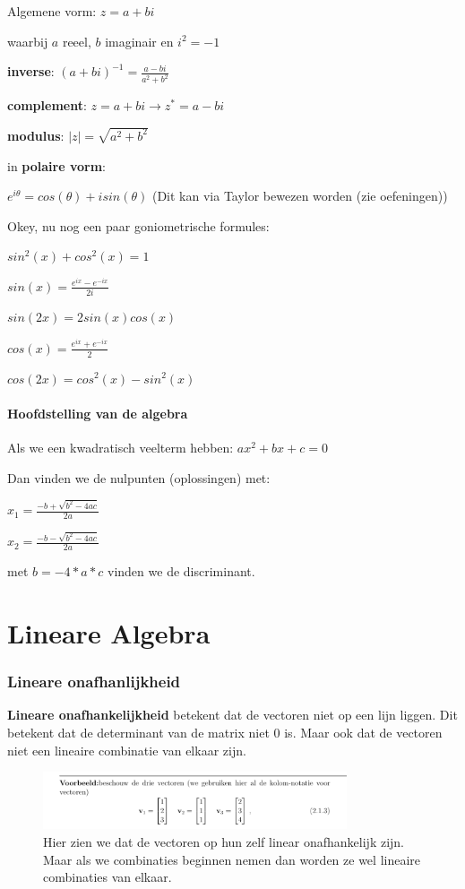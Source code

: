 \documentclass[a4paper]{report}
\begin{document}
Algemene vorm: $z = a + bi$

waarbij $a$ reeel, $b$ imaginair en $i^2 = -1$

\textbf{inverse}: $(a + bi)^{-1} = \frac{a - bi}{a^2 + b^2}$

\textbf{complement}: $z = a + bi \rightarrow z^* = a - bi$

\textbf{modulus}: $|z| = \sqrt{a^2 + b^2}$

in \textbf{polaire vorm}:

$e^{i\theta} = cos(\theta) + i sin(\theta)$ (Dit kan via Taylor bewezen worden (zie oefeningen))

Okey, nu nog een paar goniometrische formules:

$sin^2(x) + cos^2(x) = 1$

$sin(x) = \frac{e^{ix} - e^{-ix}}{2i}$

$sin(2x) = 2sin(x)cos(x)$

$cos(x) = \frac{e^{ix} + e^{-ix}}{2}$

$cos(2x) = cos^2(x) - sin^2(x)$

\subsubsection{Hoofdstelling van de algebra}

Als we een kwadratisch veelterm hebben: $ax^2 + bx + c = 0$

Dan vinden we de nulpunten (oplossingen) met:

$x_1 = \frac{-b + \sqrt{b^2 - 4ac}}{2a}$

$x_2 = \frac{-b - \sqrt{b^2 - 4ac}}{2a}$

met $b = -4*a*c$ vinden we de discriminant.

\chapter{Lineare Algebra}

\subsection{Lineare onafhanlijkheid}

\textbf{Lineare onafhankelijkheid} betekent dat de vectoren niet op een lijn liggen. Dit betekent dat de determinant van de matrix niet 0 is.
Maar ook dat de vectoren niet een lineaire combinatie van elkaar zijn.

\begin{figure}[H]
	\centering
	\includegraphics[width=0.8\textwidth]{images/ex_lin_on.png}
	\caption{Hier zien we dat de vectoren op hun zelf linear onafhankelijk zijn. Maar als we combinaties beginnen nemen dan worden ze wel lineaire combinaties van elkaar.}
\end{figure}
\end{document}
